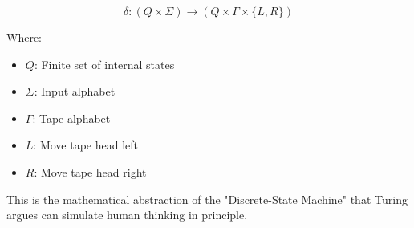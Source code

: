 % 

\begin{equation}
\boxed{\delta: (Q \times \Sigma) \rightarrow (Q \times \Gamma \times \{L, R\})}
\end{equation}

Where:
\begin{itemize}
    \item $Q$: Finite set of internal states
    \item $\Sigma$: Input alphabet
    \item $\Gamma$: Tape alphabet
    \item $L$: Move tape head left
    \item $R$: Move tape head right
\end{itemize}

This is the mathematical abstraction of the "Discrete-State Machine" that Turing argues can simulate human thinking in principle.